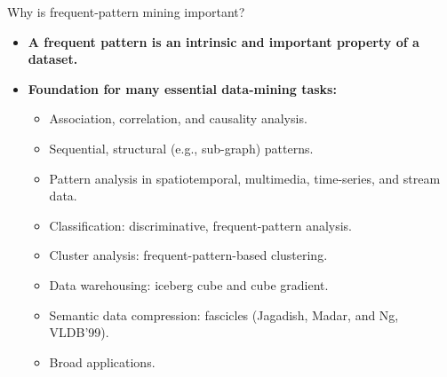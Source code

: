 \documentclass[aspectratio=169,t,xcolor=dvipsnames]{beamer}
\begin{document}
  {
    \begin{frame}{Why is frequent-pattern mining important?}
        \begin{itemize}
            \item \textbf{A frequent pattern is an intrinsic and important property of a dataset.}
            \item \textbf{Foundation for many essential data-mining tasks:}
            \begin{itemize}
              \item Association, correlation, and causality analysis.
              \item Sequential, structural (e.g., sub-graph) patterns.
              \item Pattern analysis in spatiotemporal, multimedia, time-series, and stream data.
              \item Classification: discriminative, frequent-pattern analysis.
              \item Cluster analysis: frequent-pattern-based clustering.
              \item Data warehousing: iceberg cube and cube gradient.
              \item Semantic data compression: fascicles (Jagadish, Madar, and Ng, VLDB'99).
              \item Broad applications.
            \end{itemize}
        \end{itemize}
    \end{frame}
  }
\end{document}
